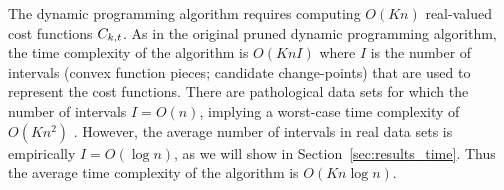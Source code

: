 \documentclass{article}
\begin{document}


The dynamic programming algorithm requires computing $O(Kn)$
real-valued cost functions $C_{k,t}$. As in the original pruned
dynamic programming algorithm, the time complexity of the algorithm is
$O(K n I)$ where $I$ is the number of intervals (convex function
pieces; candidate change-points) that are used to represent the cost
functions. There are pathological data sets for which the number of
intervals $I=O(n)$, implying a worst-case time complexity of
$O(K n^2)$ \citep{pruned-dp-new}. However, the average number of
intervals in real data sets is empirically $I=O(\log n)$, as we will
show in Section~\ref{sec:results_time}. Thus the average time
complexity of the algorithm is $O(K n \log n)$.
\end{document}
